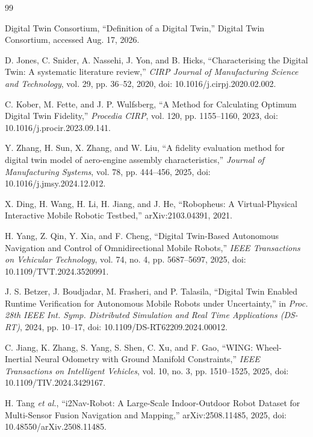 \documentclass[conference]{IEEEtran}
\begin{document}
\begin{thebibliography}{99}

Digital Twin Consortium, ``Definition of a Digital Twin,'' Digital Twin Consortium, accessed Aug. 17, 2026.

D. Jones, C. Snider, A. Nassehi, J. Yon, and B. Hicks, ``Characterising the Digital Twin: A systematic literature review,'' \emph{CIRP Journal of Manufacturing Science and Technology}, vol. 29, pp. 36--52, 2020, doi: 10.1016/j.cirpj.2020.02.002.

C. Kober, M. Fette, and J. P. Wulfsberg, ``A Method for Calculating Optimum Digital Twin Fidelity,'' \emph{Procedia CIRP}, vol. 120, pp. 1155--1160, 2023, doi: 10.1016/j.procir.2023.09.141.

Y. Zhang, H. Sun, X. Zhang, and W. Liu, ``A fidelity evaluation method for digital twin model of aero-engine assembly characteristics,'' \emph{Journal of Manufacturing Systems}, vol. 78, pp. 444--456, 2025, doi: 10.1016/j.jmsy.2024.12.012.

X. Ding, H. Wang, H. Li, H. Jiang, and J. He, ``Robopheus: A Virtual-Physical Interactive Mobile Robotic Testbed,'' arXiv:2103.04391, 2021.

H. Yang, Z. Qin, Y. Xia, and F. Cheng, ``Digital Twin-Based Autonomous Navigation and Control of Omnidirectional Mobile Robots,'' \emph{IEEE Transactions on Vehicular Technology}, vol. 74, no. 4, pp. 5687--5697, 2025, doi: 10.1109/TVT.2024.3520991.

J. S. Betzer, J. Boudjadar, M. Frasheri, and P. Talasila, ``Digital Twin Enabled Runtime Verification for Autonomous Mobile Robots under Uncertainty,'' in \emph{Proc. 28th IEEE Int. Symp. Distributed Simulation and Real Time Applications (DS-RT)}, 2024, pp. 10--17, doi: 10.1109/DS-RT62209.2024.00012.

C. Jiang, K. Zhang, S. Yang, S. Shen, C. Xu, and F. Gao, ``WING: Wheel-Inertial Neural Odometry with Ground Manifold Constraints,'' \emph{IEEE Transactions on Intelligent Vehicles}, vol. 10, no. 3, pp. 1510--1525, 2025, doi: 10.1109/TIV.2024.3429167.

H. Tang \emph{et al.}, ``i2Nav-Robot: A Large-Scale Indoor-Outdoor Robot Dataset for Multi-Sensor Fusion Navigation and Mapping,'' arXiv:2508.11485, 2025, doi: 10.48550/arXiv.2508.11485.


\end{thebibliography}
\end{document}
